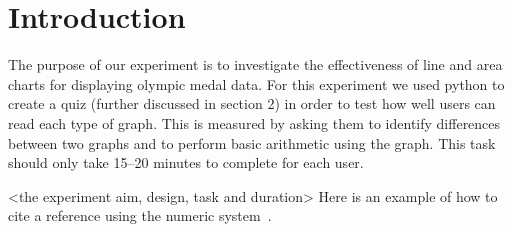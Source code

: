 \section{Introduction}

\begin{flushleft}
    The purpose of our experiment is to investigate the effectiveness of line and area charts for displaying olympic medal data.
    For this experiment we used python to create a quiz (further discussed in section 2) in order to test how well users can read
    each type of graph. This is measured by asking them to identify differences between two graphs and to perform basic arithmetic
    using the graph. This task should only take 15--20 minutes to complete for each user.
\end{flushleft}

<the experiment aim, design, task and duration> 
Here is an example of how to cite a reference using the numeric system~\cite{parikh1980adaptive}.

